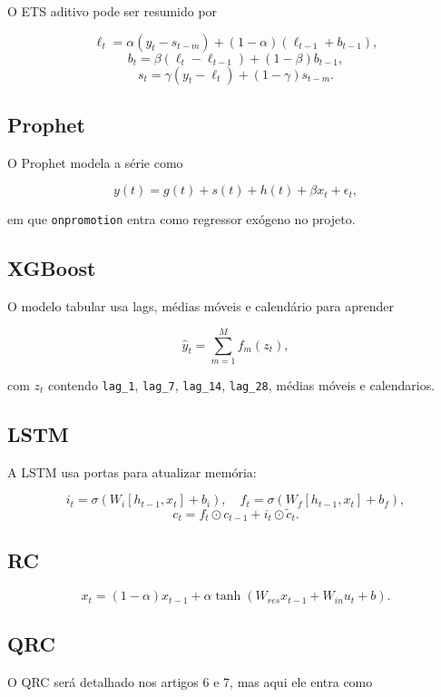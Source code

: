 \documentclass[12pt]{article}
\begin{document}
O ETS aditivo pode ser resumido por

\[
\ell_t = \alpha (y_t - s_{t-m}) + (1 - \alpha)(\ell_{t-1} + b_{t-1}),
\]
\[
b_t = \beta (\ell_t - \ell_{t-1}) + (1 - \beta) b_{t-1},
\]
\[
s_t = \gamma (y_t - \ell_t) + (1 - \gamma) s_{t-m}.
\]

\subsection{Prophet}\label{43-prophet}

O Prophet modela a série como

\[
y(t) = g(t) + s(t) + h(t) + \beta x_t + \epsilon_t,
\]

em que \texttt{onpromotion} entra como regressor exógeno no projeto.

\subsection{XGBoost}\label{44-xgboost}

O modelo tabular usa lags, médias móveis e calendário para aprender

\[
\hat{y}_t = \sum_{m=1}^M f_m(z_t),
\]

com \(z_t\) contendo \texttt{lag\_1}, \texttt{lag\_7}, \texttt{lag\_14}, \texttt{lag\_28}, médias móveis e calendarios.

\subsection{LSTM}\label{45-lstm}

A LSTM usa portas para atualizar memória:

\[
i_t = \sigma(W_i [h_{t-1}, x_t] + b_i), \quad
f_t = \sigma(W_f [h_{t-1}, x_t] + b_f),
\]
\[
c_t = f_t \odot c_{t-1} + i_t \odot \tilde{c}_t.
\]

\subsection{RC}\label{46-rc}

\[
x_t = (1 - \alpha) x_{t-1} + \alpha \tanh(W_{res} x_{t-1} + W_{in} u_t + b).
\]

\subsection{QRC}\label{47-qrc}

O QRC será detalhado nos artigos 6 e 7, mas aqui ele entra como
\end{document}
